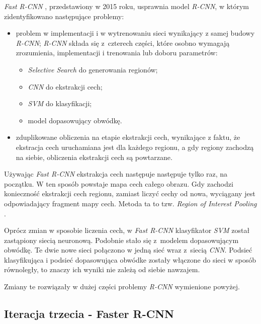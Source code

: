 
\textit{Fast R-CNN} \cite{fast-rcnn}, przedstawiony w 2015 roku, usprawnia model \textit{R-CNN}, w którym zidentyfikowano następujące problemy:

\begin{itemize}
  \item problem w implementacji i w wytrenowaniu sieci wynikający z samej budowy \textit{R-CNN}; \textit{R-CNN} składa się z~czterech części, które osobno wymagają zrozumienia, implementacji i trenowania lub doboru parametrów:
		\begin{itemize}
			\item \textit{Selective Search} do generowania regionów;
			\item \textit{CNN} do ekstrakcji cech;
			\item \textit{SVM} do klasyfikacji;
			\item model dopasowujący obwódkę.
		\end{itemize}
  \item zduplikowane obliczenia na etapie ekstrakcji cech, wynikające z faktu, że ekstracja cech uruchamiana jest dla każdego regionu, a gdy regiony zachodzą na siebie, obliczenia ekstrakcji cech są powtarzane.
\end{itemize}

Używając \textit{Fast R-CNN} ekstrakcja cech następuje następuje tylko raz, na początku.
W ten sposób powstaje mapa cech całego obrazu.
Gdy zachodzi konieczność ekstrakcji cech regionu, zamiast liczyć cechy od nowa, wyciągany jest odpowiadający fragment mapy cech.
Metoda ta to tzw. \textit{Region of Interest Pooling} \cite{region-of-interest-pooling}.

Oprócz zmian w sposobie liczenia cech, w \textit{Fast R-CNN} klasyfikator \textit{SVM} został zastąpiony siecią neuronową.
Podobnie stało się z~modelem dopasowującym obwódkę.
Te dwie nowe sieci połączono w jedną sieć wraz z~siecią \textit{CNN}.
Podsieć klasyfikująca i podsieć dopasowująca obwódke zostały włączone do sieci w sposób równoległy, to znaczy ich wyniki nie zależą od siebie nawzajem.

Zmiany te rozwiązały w dużej części problemy \textit{R-CNN} wymienione powyżej.

\newpage
\subsection{Iteracja trzecia - Faster R-CNN}

